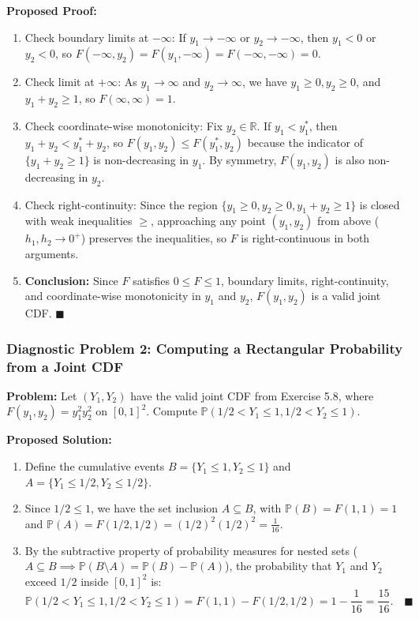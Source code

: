 \documentclass[11pt, letterpaper]{article}
\theoremstyle{definition}
\theoremstyle{remark}
\begin{document}
\textbf{Proposed Proof:}
\begin{enumerate}[label=\textbf{Step \arabic*:}]
    \item Check boundary limits at $-\infty$: If $y_1 \to -\infty$ or $y_2 \to -\infty$, then $y_1 < 0$ or $y_2 < 0$, so $F(-\infty, y_2) = F(y_1, -\infty) = F(-\infty, -\infty) = 0$.
    \item Check limit at $+\infty$: As $y_1 \to \infty$ and $y_2 \to \infty$, we have $y_1 \ge 0, y_2 \ge 0$, and $y_1 + y_2 \ge 1$, so $F(\infty, \infty) = 1$.
    \item Check coordinate-wise monotonicity: Fix $y_2 \in \mathbb{R}$. If $y_1 < y_1^*$, then $y_1 + y_2 < y_1^* + y_2$, so $F(y_1, y_2) \le F(y_1^*, y_2)$ because the indicator of $\{y_1 + y_2 \ge 1\}$ is non-decreasing in $y_1$. By symmetry, $F(y_1, y_2)$ is also non-decreasing in $y_2$.
    \item Check right-continuity: Since the region $\{y_1 \ge 0, y_2 \ge 0, y_1 + y_2 \ge 1\}$ is closed with weak inequalities $\ge$, approaching any point $(y_1, y_2)$ from above ($h_1, h_2 \to 0^+$) preserves the inequalities, so $F$ is right-continuous in both arguments.
    \item \textbf{Conclusion:} Since $F$ satisfies $0 \le F \le 1$, boundary limits, right-continuity, and coordinate-wise monotonicity in $y_1$ and $y_2$, $F(y_1, y_2)$ is a valid joint CDF. $\blacksquare$
\end{enumerate}

\bigskip

\subsubsection*{Diagnostic Problem 2: Computing a Rectangular Probability from a Joint CDF}
\textbf{Problem:} Let $(Y_1, Y_2)$ have the valid joint CDF from Exercise 5.8, where $F(y_1, y_2) = y_1^2 y_2^2$ on $[0, 1]^2$. Compute $\mathbb{P}(1/2 < Y_1 \le 1, 1/2 < Y_2 \le 1)$.

\textbf{Proposed Solution:}
\begin{enumerate}[label=\textbf{Step \arabic*:}]
    \item Define the cumulative events $B = \{Y_1 \le 1, Y_2 \le 1\}$ and $A = \{Y_1 \le 1/2, Y_2 \le 1/2\}$.
    \item Since $1/2 \le 1$, we have the set inclusion $A \subseteq B$, with $\mathbb{P}(B) = F(1, 1) = 1$ and $\mathbb{P}(A) = F(1/2, 1/2) = (1/2)^2(1/2)^2 = \frac{1}{16}$.
    \item By the subtractive property of probability measures for nested sets ($A \subseteq B \implies \mathbb{P}(B \setminus A) = \mathbb{P}(B) - \mathbb{P}(A)$), the probability that $Y_1$ and $Y_2$ exceed $1/2$ inside $[0, 1]^2$ is:
    \[
        \mathbb{P}(1/2 < Y_1 \le 1, 1/2 < Y_2 \le 1) = F(1, 1) - F(1/2, 1/2) = 1 - \frac{1}{16} = \frac{15}{16}. \quad \blacksquare
    \]
\end{enumerate}
\end{document}
